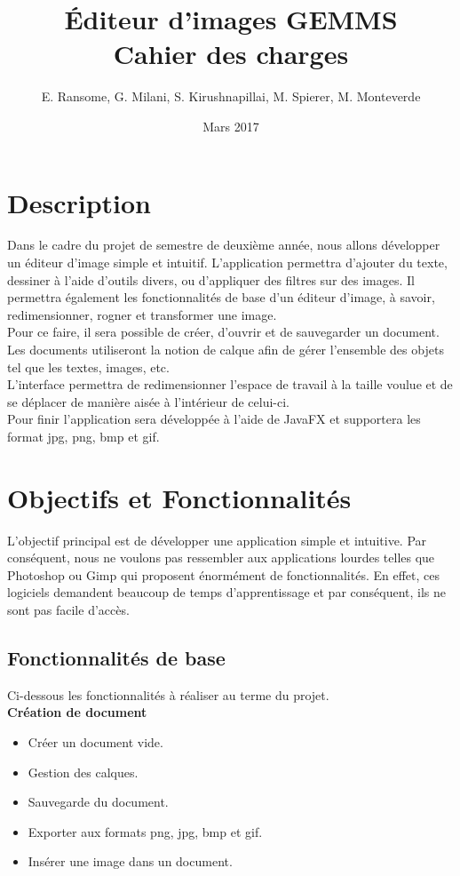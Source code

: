 \documentclass[11pt, a4paper, french]{article}
\title{Éditeur d'images GEMMS \\ Cahier des charges}
\author{E. Ransome, G. Milani, S. Kirushnapillai, M. Spierer, M. Monteverde}
\date{Mars 2017}
\begin{document}
	\maketitle
	\thispagestyle{empty}
	\tableofcontents
	\pagebreak

	\section{Description}
		Dans le cadre du projet de semestre de deuxième année, nous allons développer un éditeur d'image simple et intuitif. L'application permettra d'ajouter du texte, dessiner à l'aide d'outils divers, ou d'appliquer des filtres sur des images. Il permettra également les fonctionnalités de base d'un éditeur d'image, à savoir, redimensionner, rogner et transformer une image. \\

		Pour ce faire, il sera possible de créer, d'ouvrir et de sauvegarder un document. Les documents utiliseront la notion de calque afin de gérer l'ensemble des objets tel que les textes, images, etc. \\

		L'interface permettra de redimensionner l'espace de travail à la taille voulue et de se déplacer de manière aisée à l'intérieur de celui-ci. \\

		Pour finir l'application sera développée à l'aide de JavaFX et supportera les format jpg, png, bmp et gif.

	\section{Objectifs et Fonctionnalités}

		L'objectif principal est de développer une application simple et intuitive. Par conséquent, nous ne voulons pas ressembler aux applications lourdes telles que Photoshop ou Gimp qui proposent énormément de fonctionnalités. En effet, ces logiciels demandent beaucoup de temps d'apprentissage et par conséquent, ils ne sont pas facile d'accès.

		\subsection{Fonctionnalités de base}

			Ci-dessous les fonctionnalités à réaliser au terme du projet.\\

			\textbf{Création de document}
			\begin{itemize}[label=\textbullet]
				\item Créer un document vide.
				\item Gestion des calques.
				\item Sauvegarde du document.
				\item Exporter aux formats png, jpg, bmp et gif.
				\item Insérer une image dans un document. \\
			\end{itemize}
\end{document}
